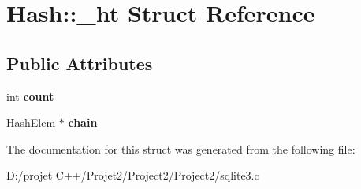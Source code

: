 \hypertarget{struct_hash_1_1__ht}{}\section{Hash\+:\+:\+\_\+ht Struct Reference}
\label{struct_hash_1_1__ht}
\subsection*{Public Attributes}
\begin{DoxyCompactItemize}
\item 
\mbox{\label{struct_hash_1_1__ht_a0677191178b6c7c5c6c2880f41cf24b1}} 
int {\bfseries count}
\item 
\mbox{\label{struct_hash_1_1__ht_a56fc145e7d38d9440d85ab2ea63a48ac}} 
\mbox{\hyperlink{struct_hash_elem}{Hash\+Elem}} $\ast$ {\bfseries chain}
\end{DoxyCompactItemize}


The documentation for this struct was generated from the following file\+:\begin{DoxyCompactItemize}
\item 
D\+:/projet C++/\+Projet2/\+Project2/\+Project2/sqlite3.\+c\end{DoxyCompactItemize}
